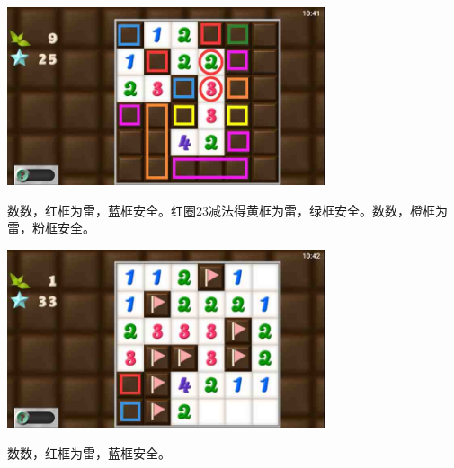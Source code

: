 \begin{center}
    \includegraphics[width=0.7\textwidth]{puzzlelow/211-3.jpg}
\end{center}
数数，红框为雷，蓝框安全。红圈23减法得黄框为雷，绿框安全。数数，橙框为雷，粉框安全。
\begin{center}
    \includegraphics[width=0.7\textwidth]{puzzlelow/211-4.jpg}
\end{center}
数数，红框为雷，蓝框安全。

